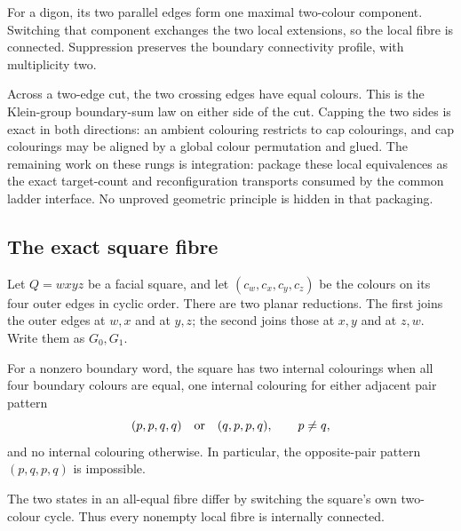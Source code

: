 For a digon, its two parallel edges form one maximal two-colour component.
Switching that component exchanges the two local extensions, so the local
fibre is connected.  Suppression preserves the boundary connectivity
profile, with multiplicity two.

Across a two-edge cut, the two crossing edges have equal colours.  This is
the Klein-group boundary-sum law on either side of the cut.  Capping the two
sides is exact in both directions: an ambient colouring restricts to cap
colourings, and cap colourings may be aligned by a global colour permutation
and glued.
The remaining work on these rungs is integration: package these local
equivalences as the exact target-count and reconfiguration transports
consumed by the common ladder interface.  No unproved geometric principle is
hidden in that packaging.

\subsection{The exact square fibre}

Let \(Q=wxyz\) be a facial square, and let
\((c_w,c_x,c_y,c_z)\) be the colours on its four outer edges in cyclic
order.  There are two planar reductions.  The first joins the outer edges at
\(w,x\) and at \(y,z\); the second joins those at \(x,y\) and at \(z,w\).
Write them as \(G_0,G_1\).

\begin{theorem}
\label{thm:square-fibre-table}
For a nonzero boundary word, the square has two internal colourings when all
four boundary colours are equal, one internal colouring for either adjacent
pair pattern
\[
 (p,p,q,q)\quad\hbox{or}\quad(q,p,p,q),\qquad p\ne q,
\]
and no internal colouring otherwise.  In particular, the opposite-pair
pattern \((p,q,p,q)\) is impossible.
\end{theorem}

The two states in an all-equal fibre differ by switching the square's own
two-colour cycle.  Thus every nonempty local fibre is internally connected.

